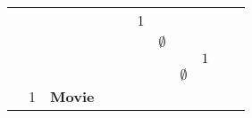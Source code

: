 \begin{table}[]
{\begin{tabular}{lllllllllll}
                          &                           &                   &                                                                          &                                                                        & \cellcolor[HTML]{FC8D59}1 &                                                             &                                                                            &                                                                           &                                 &                                                                        \\
                          &                           &                   &                                                                          &                                                                        &                           & \cellcolor[HTML]{FC8D59}$\emptyset$                         &                                                                            &                                                                           &                                 &                                                                        \\
                          &                           &                   &                                                                          &                                                                        &                           &                                                             &                                                                            & \cellcolor[HTML]{FC8D59}$1$                                               &                                 &                                                                        \\
                          &                           &                   &                                                                          &                                                                        &                           &                                                             & \cellcolor[HTML]{FC8D59}$\emptyset$                                        &                                                                           &                                 &                                                                        \\
                          & \cellcolor[HTML]{FC8D59}1 & \textbf{Movie}    &                                                                          &                                                                        &                           &                                                             &                                                                            &                                                                           &                                 &                                                                        \\

\end{tabular}}
\end{table}
